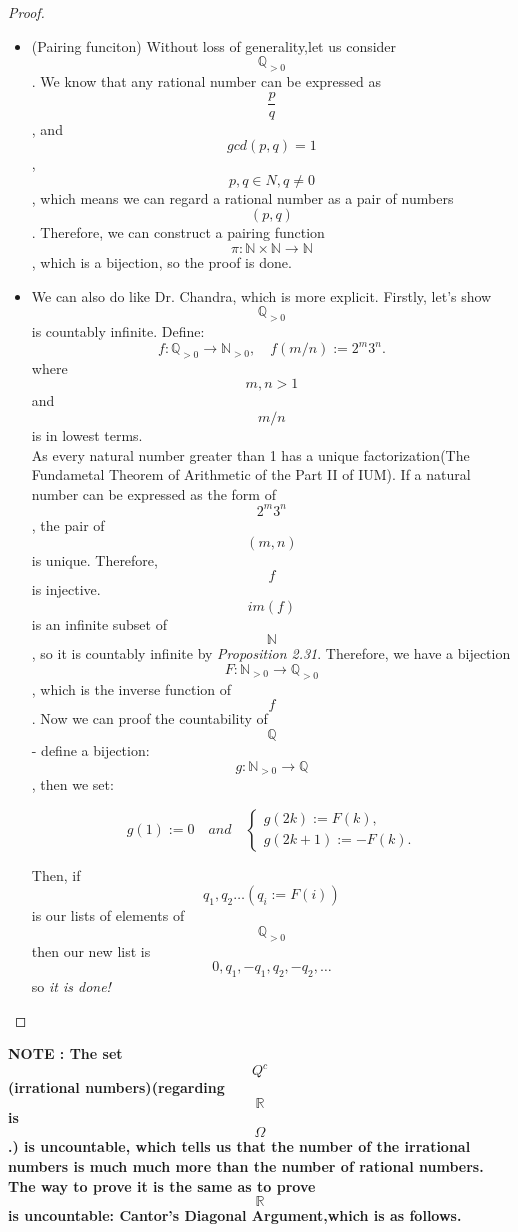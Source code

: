\documentclass[a4paper]{article}
\begin{document}
\begin{proof}
\begin{itemize}
    \item (Pairing funciton) Without loss of generality,let us consider $$\mathbb{Q}_{>0}$$. We know that any rational number can be expressed as $$\frac{p}{q}$$, and $$gcd(p,q)=1$$, $$p,q\in N, q\neq 0$$, which means we can regard a rational number as a pair of numbers $$(p,q)$$. Therefore, we can construct a pairing function $$\pi: \mathbb{N} \times \mathbb{N} \rightarrow \mathbb{N}$$, which is a bijection, so the proof is done.
    \item We can also do like Dr. Chandra, which is more explicit.
          Firstly, let's show $$\mathbb{Q}_{>0}$$ is countably infinite. Define: 
          \begin{equation*}
          f:\mathbb{Q}_{>0}\rightarrow\mathbb{N}_{>0}, \quad f(m/n):=2^m3^n.
          \end{equation*}
          where $$m,n>1$$ and $$m/n$$ is in lowest terms. \\
          As every natural number greater than 1 has a unique factorization(The Fundametal Theorem of Arithmetic of the Part II of IUM). If a natural number can be expressed as the form of $$2^m3^n$$, the pair of $$(m,n)$$ is unique. Therefore, $$f$$ is injective.
          $$im(f)$$ is an infinite subset of $$\mathbb{N}$$, so it is countably infinite by \emph{Proposition 2.31}. Therefore, we have a bijection $$F:\mathbb{N}_{>0}\rightarrow\mathbb{Q}_{>0}$$, which is the inverse function of $$f$$.
          Now we can proof the countability of $$\mathbb{Q}$$ - define a bijection: $$g:\mathbb{N}_{>0}\rightarrow\mathbb{Q}$$, then we set:
          \begin{center}
            $$g(1):=0 \quad and \quad \begin{cases} 
                                     g(2k):=F(k),\\ 
                                     g(2k+1):=-F(k).
                                     \end{cases}$$
          \end{center}
          Then, if $$q_1,q_2\ldots(q_i:=F(i))$$ is our lists of elements of $$\mathbb{Q}_{>0}$$ then our new list is $$0,q_1,-q_1,q_2,-q_2,\ldots$$ so \textit{it is done!}
        \end{itemize}
\end{proof}
\textbf{NOTE : The set $$Q^c$$(irrational numbers)(regarding $$\mathbb{R}$$ is $$\Omega$$.) is uncountable, which tells us that the number of the irrational numbers is much much more than the number of rational numbers. The way to prove it is the same as to prove $$\mathbb{R}$$ is uncountable: Cantor's Diagonal Argument,which is as follows.}
\end{document}
